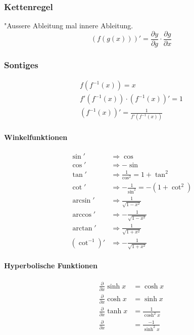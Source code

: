 \subsubsection{Kettenregel}
"Aussere Ableitung mal innere Ableitung.
\begin{equation}
{\left(f(g(x))\right)}' = \frac{\partial y}{\partial g} \cdot \frac{\partial g}{\partial x}
\end{equation}

\subsubsection{Sontiges}
\begin{gather}
f\left(f^{-1}(x)\right) = x \\
f'\left(f^{-1}(x)\right)\cdot{\left(f^{-1}(x)\right)}' = 1 \\
{\left(f^{-1}(x)\right)}' = \frac{1}{f'\left(f^{-1}(x)\right)}
\end{gather}

\paragraph{Winkelfunktionen}
\begin{align}
  \sin' & \Longrightarrow \cos \\
  \cos' & \Longrightarrow -\sin \\
  \tan' & \Longrightarrow \frac{1}{\cos^2} = 1+\tan^2 \\
  \cot' & \Longrightarrow -\frac{1}{\sin^2} = - \left( 1 + \cot^2 \right) \\
  \arcsin' & \Longrightarrow \frac{1}{\sqrt{1-x^2}} \\
  \arccos' & \Longrightarrow -\frac{1}{\sqrt{1-x^2}} \\
  \arctan' & \Longrightarrow \frac{1}{\sqrt{1+x^2}} \\
  {\left(\cot^{-1}\right)}' & \Longrightarrow -\frac{1}{\sqrt{1+x^2}}
\end{align}

\paragraph{Hyperbolische Funktionen}
\begin{align}
  \frac{\partial}{\partial x}\sinh{x} &= \cosh{x} \\
  \frac{\partial}{\partial x}\cosh{x} &= \sinh{x} \\
  \frac{\partial}{\partial x}\tanh{x} &= \frac{1}{\cosh^2{x}} \\
  \frac{\partial}{\partial x} &= \frac{-1}{\sinh^2{x}} \\
\end{align}

